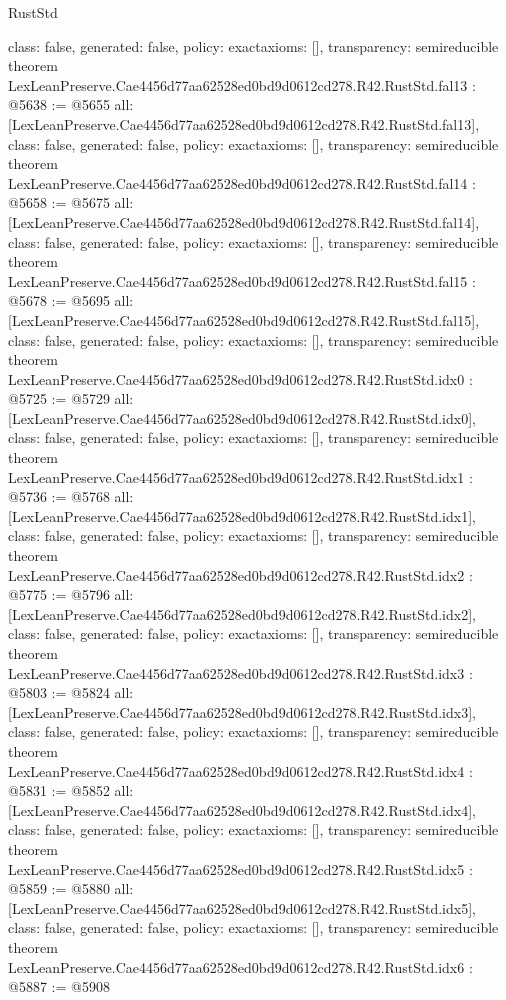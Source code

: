 \begin{lexlean}{RustStd}
\begin{coremodule}
{  class: false,
  generated: false,
  policy: exact{axioms: []},
  transparency: semireducible
}
theorem LexLeanPreserve.Cae4456d77aa62528ed0bd9d0612cd278.R42.RustStd.fal13 : @5638 := @5655 {
  all: [LexLeanPreserve.Cae4456d77aa62528ed0bd9d0612cd278.R42.RustStd.fal13],
  class: false,
  generated: false,
  policy: exact{axioms: []},
  transparency: semireducible
}
theorem LexLeanPreserve.Cae4456d77aa62528ed0bd9d0612cd278.R42.RustStd.fal14 : @5658 := @5675 {
  all: [LexLeanPreserve.Cae4456d77aa62528ed0bd9d0612cd278.R42.RustStd.fal14],
  class: false,
  generated: false,
  policy: exact{axioms: []},
  transparency: semireducible
}
theorem LexLeanPreserve.Cae4456d77aa62528ed0bd9d0612cd278.R42.RustStd.fal15 : @5678 := @5695 {
  all: [LexLeanPreserve.Cae4456d77aa62528ed0bd9d0612cd278.R42.RustStd.fal15],
  class: false,
  generated: false,
  policy: exact{axioms: []},
  transparency: semireducible
}
theorem LexLeanPreserve.Cae4456d77aa62528ed0bd9d0612cd278.R42.RustStd.idx0 : @5725 := @5729 {
  all: [LexLeanPreserve.Cae4456d77aa62528ed0bd9d0612cd278.R42.RustStd.idx0],
  class: false,
  generated: false,
  policy: exact{axioms: []},
  transparency: semireducible
}
theorem LexLeanPreserve.Cae4456d77aa62528ed0bd9d0612cd278.R42.RustStd.idx1 : @5736 := @5768 {
  all: [LexLeanPreserve.Cae4456d77aa62528ed0bd9d0612cd278.R42.RustStd.idx1],
  class: false,
  generated: false,
  policy: exact{axioms: []},
  transparency: semireducible
}
theorem LexLeanPreserve.Cae4456d77aa62528ed0bd9d0612cd278.R42.RustStd.idx2 : @5775 := @5796 {
  all: [LexLeanPreserve.Cae4456d77aa62528ed0bd9d0612cd278.R42.RustStd.idx2],
  class: false,
  generated: false,
  policy: exact{axioms: []},
  transparency: semireducible
}
theorem LexLeanPreserve.Cae4456d77aa62528ed0bd9d0612cd278.R42.RustStd.idx3 : @5803 := @5824 {
  all: [LexLeanPreserve.Cae4456d77aa62528ed0bd9d0612cd278.R42.RustStd.idx3],
  class: false,
  generated: false,
  policy: exact{axioms: []},
  transparency: semireducible
}
theorem LexLeanPreserve.Cae4456d77aa62528ed0bd9d0612cd278.R42.RustStd.idx4 : @5831 := @5852 {
  all: [LexLeanPreserve.Cae4456d77aa62528ed0bd9d0612cd278.R42.RustStd.idx4],
  class: false,
  generated: false,
  policy: exact{axioms: []},
  transparency: semireducible
}
theorem LexLeanPreserve.Cae4456d77aa62528ed0bd9d0612cd278.R42.RustStd.idx5 : @5859 := @5880 {
  all: [LexLeanPreserve.Cae4456d77aa62528ed0bd9d0612cd278.R42.RustStd.idx5],
  class: false,
  generated: false,
  policy: exact{axioms: []},
  transparency: semireducible
}
theorem LexLeanPreserve.Cae4456d77aa62528ed0bd9d0612cd278.R42.RustStd.idx6 : @5887 := @5908 {
}
\end{coremodule}
\end{lexlean}
